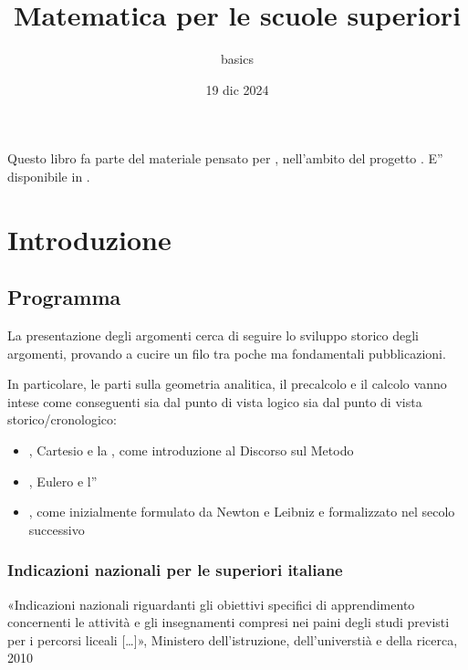 \documentclass[letterpaper,10pt,italian]{jupyterBook}
\title{Matematica per le scuole superiori}
\date{19 dic 2024}
\author{basics}
\begin{document}
\pagestyle{empty}
\sphinxmaketitle
\pagestyle{plain}
\sphinxtableofcontents
\pagestyle{normal}
\label{\detokenize{intro::doc}}


\sphinxAtStartPar
Questo libro fa parte del materiale pensato per , nell’ambito del progetto . E” disponibile in .









\sphinxstepscope


\part{Introduzione}

\sphinxstepscope


\chapter{Programma}
\label{\detokenize{ch/program:programma}}\label{\detokenize{ch/program::doc}}
\sphinxAtStartPar
La presentazione degli argomenti cerca di seguire lo sviluppo storico degli argomenti, provando a cucire un filo tra poche ma fondamentali pubblicazioni.

\sphinxAtStartPar
In particolare, le parti sulla geometria analitica, il precalcolo e il calcolo vanno intese come conseguenti sia dal punto di vista logico sia dal punto di vista storico/cronologico:
\begin{itemize}
\item {} 
\sphinxAtStartPar
{}, Cartesio e la , come introduzione al Discorso sul Metodo

\item {} 
\sphinxAtStartPar
{}, Eulero e l”

\item {} 
\sphinxAtStartPar
{}, come inizialmente formulato da Newton e Leibniz e formalizzato nel secolo successivo

\end{itemize}

\sphinxstepscope


\section{Indicazioni nazionali per le superiori italiane}
\label{\detokenize{ch/program/current-guidelines-italy:indicazioni-nazionali-per-le-superiori-italiane}}\label{\detokenize{ch/program/current-guidelines-italy::doc}}
\sphinxAtStartPar
«Indicazioni nazionali riguardanti gli obiettivi specifici di apprendimento concernenti le attività e gli insegnamenti compresi nei paini degli studi previsti per i percorsi liceali {[}…{]}», Ministero dell’istruzione, dell’universtià e della ricerca, 2010
\end{document}
